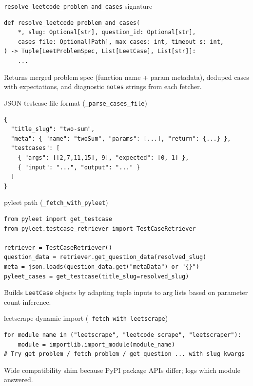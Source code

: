 \documentclass[aspectratio=169]{beamer}
\begin{document}
\begin{frame}[fragile]{\texttt{resolve\_leetcode\_problem\_and\_cases} signature}
\begin{lstlisting}[style=py]
def resolve_leetcode_problem_and_cases(
    *, slug: Optional[str], question_id: Optional[str],
    cases_file: Optional[Path], max_cases: int, timeout_s: int,
) -> Tuple[LeetProblemSpec, List[LeetCase], List[str]]:
    ...
\end{lstlisting}
\vfill
\tiny Returns merged problem spec (function name + param metadata), deduped cases with expectations, and diagnostic \texttt{notes} strings from each fetcher.
\end{frame}

\begin{frame}[fragile]{JSON testcase file format (\texttt{\_parse\_cases\_file})}
\begin{lstlisting}[style=pys]
{
  "title_slug": "two-sum",
  "meta": { "name": "twoSum", "params": [...], "return": {...} },
  "testcases": [
    { "args": [[2,7,11,15], 9], "expected": [0, 1] },
    { "input": "...", "output": "..." }
  ]
}
\end{lstlisting}
\end{frame}

\begin{frame}[fragile]{pyleet path (\texttt{\_fetch\_with\_pyleet})}
\begin{lstlisting}[style=py]
from pyleet import get_testcase
from pyleet.testcase_retriever import TestCaseRetriever

retriever = TestCaseRetriever()
question_data = retriever.get_question_data(resolved_slug)
meta = json.loads(question_data.get("metaData") or "{}")
pyleet_cases = get_testcase(title_slug=resolved_slug)
\end{lstlisting}
\vfill
\tiny Builds \texttt{LeetCase} objects by adapting tuple inputs to arg lists based on parameter count inference.
\end{frame}

\begin{frame}[fragile]{leetscrape dynamic import (\texttt{\_fetch\_with\_leetscrape})}
\begin{lstlisting}[style=py]
for module_name in ("leetscrape", "leetcode_scrape", "leetscraper"):
    module = importlib.import_module(module_name)
# Try get_problem / fetch_problem / get_question ... with slug kwargs
\end{lstlisting}
\vfill
\tiny Wide compatibility shim because PyPI package APIs differ; logs which module answered.
\end{frame}
\end{document}
